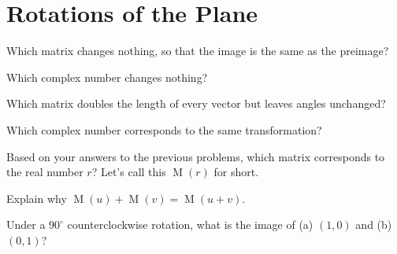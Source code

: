 \documentclass[../gatm_answers.tex]{subfiles}
\begin{document}
\section{Rotations of the Plane}

\newcommand{\Mat}{\operatorname{M}}
\newcommand{\cis}{\operatorname{cis}}

\begin{outer_problem}[start=1]
\item \label{prob:pr_start}
\end{outer_problem}

\begin{inner_problem}[start=1]
\item Which matrix changes nothing, so that the image is the same as the preimage?
\end{inner_problem}

\begin{inner_problem}
\item Which complex number changes nothing?
\end{inner_problem}

\begin{outer_problem}
\item 
\end{outer_problem}

\begin{inner_problem}[start=1]
\item Which matrix doubles the length of every vector but leaves angles unchanged?
\end{inner_problem}

\begin{inner_problem}
\item Which complex number corresponds to the same transformation?
\end{inner_problem}

\begin{outer_problem}
\item Based on your answers to the previous problems, which matrix corresponds to the real number $r$? Let's call this $\Mat (r)$ for short.
\end{outer_problem}

\begin{outer_problem}
\item Explain why $\Mat (u)+\Mat(v)=\Mat(u+v).$
\end{outer_problem}

\begin{outer_problem}
\item Under a $90^\circ$ counterclockwise rotation, what is the image of (a) $(1,0)$ and (b) $(0,1)$?
\end{outer_problem}
\end{document}
